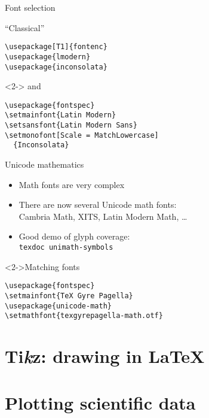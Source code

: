 \begin{frame}[fragile]{Font selection}

  \begin{block}{\enquote{Classical}}
    \begin{verbatim}
\usepackage[T1]{fontenc}
\usepackage{lmodern}
\usepackage{inconsolata}
    \end{verbatim}
  \end{block}

  \vspace{-\baselineskip}
  \begin{block}<2->{\XeTeX{} and \LuaTeX{}}
    \begin{verbatim}
\usepackage{fontspec}
\setmainfont{Latin Modern}
\setsansfont{Latin Modern Sans}
\setmonofont[Scale = MatchLowercase]
  {Inconsolata}
    \end{verbatim}
  \end{block}

\end{frame}

\begin{frame}[fragile]{Unicode mathematics}

  \begin{itemize}
    \item Math fonts are very complex
    \item There are now several Unicode math fonts:\\
      Cambria Math, XITS, Latin Modern Math, \ldots 
    \item Good demo of glyph coverage:\\
      \texttt{texdoc unimath-symbols}
  \end{itemize}
  
  \begin{block}<2->{Matching fonts}
    \begin{verbatim}
\usepackage{fontspec}
\setmainfont{TeX Gyre Pagella}
\usepackage{unicode-math}
\setmathfont{texgyrepagella-math.otf}
    \end{verbatim}
  \end{block}

\end{frame}


\section{Ti\protect\emph{k}z: drawing in \LaTeX{}}

\section{Plotting scientific data}

